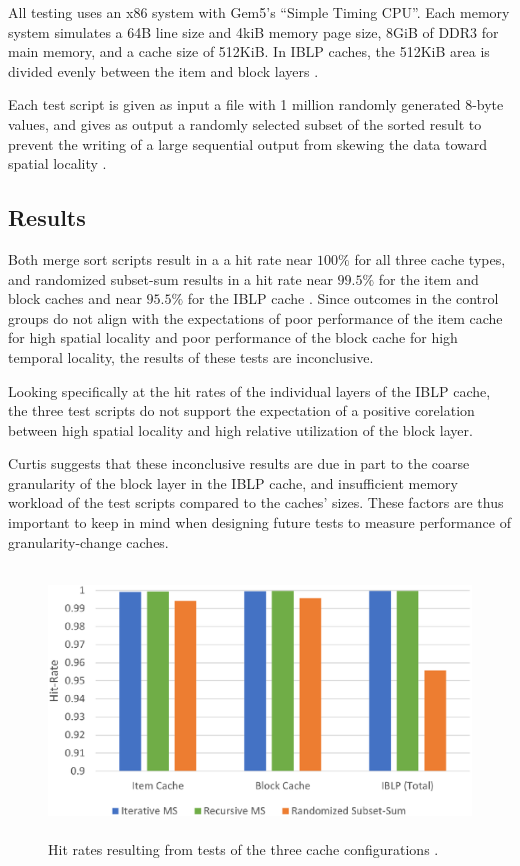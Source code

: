 \documentclass[12pt,twoside]{reedthesis}
\begin{document}
	All testing uses an x86 system with Gem5's ``Simple Timing CPU''. Each memory system simulates a 64B line size and 4kiB memory page size, 8GiB of DDR3 for main memory, and a cache size of 512KiB. In IBLP caches, the 512KiB area is divided evenly between the item and block layers \cite{curtis}.

	Each test script is given as input a file with 1 million randomly generated 8-byte values, and gives as output a randomly selected subset of the sorted result to prevent the writing of a large sequential output from skewing the data toward spatial locality \cite{curtis}.

	\subsection*{Results}

	Both merge sort scripts result in a a hit rate near $100\%$ for all three cache types, and randomized subset-sum results in a hit rate near $99.5\%$ for the item and block caches and near $95.5\%$ for the IBLP cache \cite{curtis}. Since outcomes in the control groups do not align with the expectations of poor performance of the item cache for high spatial locality and poor performance of the block cache for high temporal locality, the results of these tests are inconclusive.

	Looking specifically at the hit rates of the individual layers of the IBLP cache, the three test scripts do not support the expectation of a positive corelation between high spatial locality and high relative utilization of the block layer.

	Curtis suggests that these inconclusive results are due in part to the coarse granularity of the block layer in the IBLP cache, and insufficient memory workload of the test scripts compared to the caches' sizes. These factors are thus important to keep in mind when designing future tests to measure performance of granularity-change caches.

	\newpage
	\null
	\vfill

	\begin{figure}[H]
		\centering
		\includegraphics[height=2.8in]{figures/curtis_cache_hit_rates.png}
		\caption{Hit rates resulting from tests of the three cache configurations \cite{curtis}.}
	\end{figure}
\end{document}
